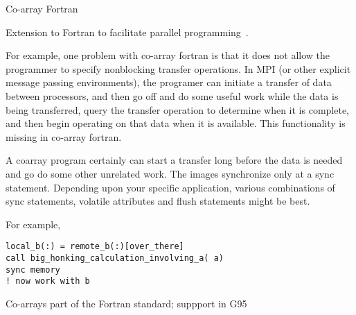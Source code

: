  {Co-array Fortran}

Extension to Fortran to facilitate parallel programming~\cite{coarray}.

For example, one problem with co-array fortran is that it does not
allow the programmer to specify nonblocking transfer operations. In
MPI (or other explicit message passing environments), the programer
can initiate a transfer of data between processors, and then go off
and do some useful work while the data is being transferred, query
the transfer operation to determine when it is complete, and then
begin operating on that data when it is available. This
functionality is missing in co-array fortran.

A coarray program certainly can start a transfer long before
the data is needed and go do some other unrelated work.
The images synchronize only at a sync statement.
Depending upon your specific application, various combinations
of sync statements, volatile attributes and flush statements
might be best.

For example,

\begin{verbatim}
local_b(:) = remote_b(:)[over_there]
call big_honking_calculation_involving_a( a)
sync memory
! now work with b
\end{verbatim}

Co-arrays part of the Fortran standard;
suppport in G95~\cite{g95coarray}
